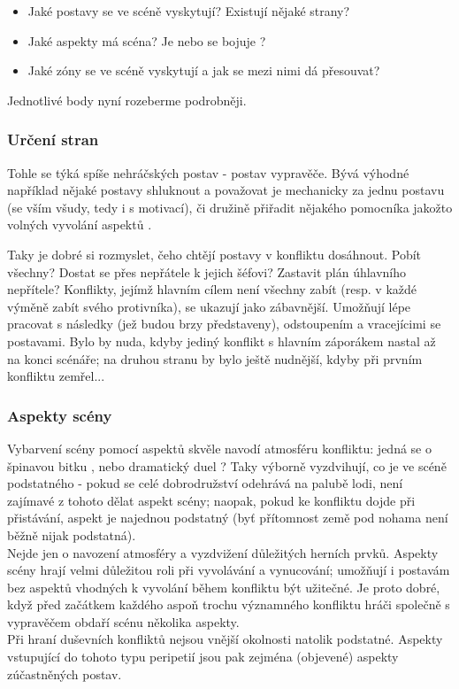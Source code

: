 \begin{itemize}
\item Jaké postavy se ve scéně vyskytují? Existují nějaké strany?
\item Jaké aspekty má scéna? Je  nebo se bojuje ?
\item Jaké zóny se ve scéně vyskytují a jak se mezi nimi dá přesouvat?
\end{itemize}

Jednotlivé body nyní rozeberme podrobněji.

\subsubsection{Určení stran}
\label{sec:urcenistran}
Tohle se týká spíše nehráčských postav - postav vypravěče. Bývá výhodné například nějaké postavy shluknout a považovat je mechanicky za jednu postavu (se vším všudy, tedy i s motivací), či družině přiřadit nějakého pomocníka jakožto volných vyvolání aspektů .

Taky je dobré si rozmyslet, čeho chtějí postavy v konfliktu dosáhnout. Pobít všechny? Dostat se přes nepřátele k jejich šéfovi? Zastavit plán úhlavního nepřítele? Konflikty, jejímž hlavním cílem není všechny zabít (resp. v každé výměně zabít svého protivníka), se ukazují jako zábavnější. Umožňují lépe pracovat s následky (jež budou brzy představeny), odstoupením a vracejícimi se postavami. Bylo by nuda, kdyby jediný konflikt s hlavním záporákem nastal až na konci scénáře; na druhou stranu by bylo ještě nudnější, kdyby při prvním konfliktu zemřel...

\subsubsection{Aspekty scény}
\label{sec:aspektysceny}

Vybarvení scény pomocí aspektů skvěle navodí atmosféru konfliktu: jedná se o špinavou bitku , nebo dramatický duel ? Taky výborně vyzdvihují, co je ve scéně podstatného - pokud se celé dobrodružství odehrává na palubě lodi, není zajímavé z tohoto dělat aspekt scény; naopak, pokud ke konfliktu dojde při přistávání, aspekt  je najednou podstatný (byť přítomnost země pod nohama není běžně nijak podstatná).\\
Nejde jen o navození atmosféry a vyzdvižení důležitých herních prvků. Aspekty scény hrají velmi důležitou roli při vyvolávání a vynucování; umožňují i postavám bez aspektů vhodných k vyvolání během konfliktu být užitečné. Je proto dobré, když před začátkem každého aspoň trochu významného konfliktu hráči společně s vypravěčem obdaří scénu několika aspekty.\\
Při hraní duševních konfliktů nejsou vnější okolnosti natolik podstatné. Aspekty vstupující do tohoto typu peripetií jsou pak zejména (objevené) aspekty zúčastněných postav.


